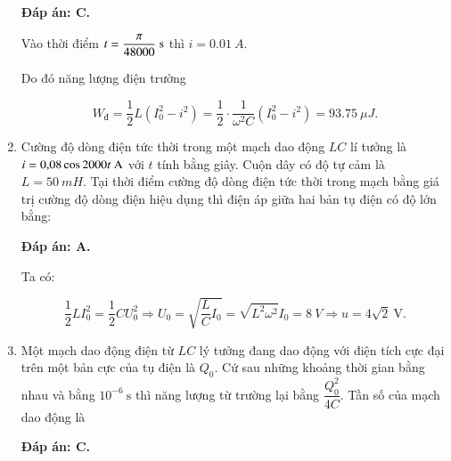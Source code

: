\begin{enumerate}[label=\bfseries Câu \arabic*:]
	\hideall
	{		\textbf{Đáp án: C.}
		
		Vào thời điểm $t = \dfrac{\pi}{48000}\ \text s$ thì $i = \SI{0,01}{A}.$
		
		Do đó năng lượng điện trường
		
		$$W_\text{đ} = \dfrac{1}{2} L(I_0^2 -i^2) = \dfrac{1}{2} \cdot \dfrac{1}{\omega^2 C} (I_0^2 - i^2) = \SI{93,75}{\mu J}.$$
		
		
	}
	\item {}
	
	{
		Cường độ dòng điện tức thời trong một mạch dao động $LC$ lí tưởng là $i =\text{0,08} \cos 2000 t\ \text A$ với $t$ tính bằng giây. Cuộn dây có độ tự cảm là $L = \SI{50}{mH}$. Tại thời điểm cường độ dòng điện tức thời trong mạch bằng giá trị cường độ dòng điện hiệu dụng thì điện áp giữa hai bản tụ điện có độ lớn bằng:
		
	}
	
	\hideall
	{		\textbf{Đáp án: A.}
		
		Ta có: 
		
		$$\dfrac{1}{2}LI^2_0 = \dfrac{1}{2} CU^2_0 \Rightarrow U_0 = \sqrt{\dfrac{L}{C}I_0} = \sqrt{L^2\omega^2}I_0 = \SI{8}{V}  \Rightarrow u = 4\sqrt 2\ \text{V}.$$
		
	}
	\item {}
	
	{
		Một mạch dao động điện từ $LC$ lý tưởng đang dao động với điện tích cực đại trên một bản cực của tụ điện là $Q_0$. Cứ sau những khoảng thời gian bằng nhau và bằng $10^{-6}\ \text{s}$ thì năng lượng từ trường lại bằng $\dfrac{Q_0^2}{4C}$. Tần số của mạch dao động là
		
	}
	
	\hideall
	{		\textbf{Đáp án: C.}
		
}
\end{enumerate}
